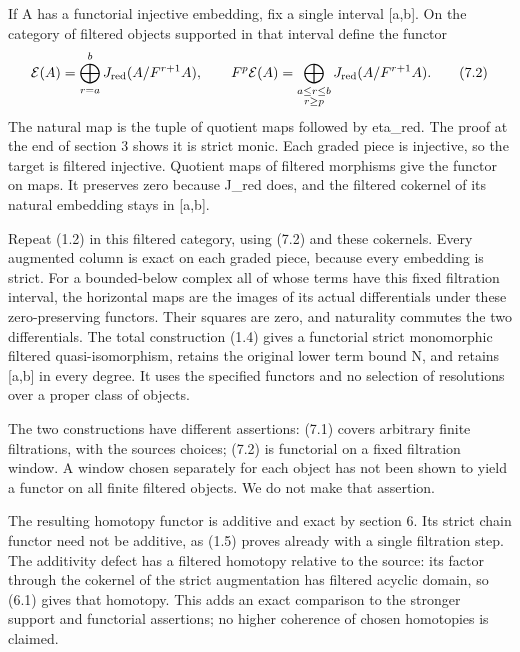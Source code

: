 \documentclass[11pt]{article}
\begin{document}
If A has a functorial injective embedding,\allowbreak{} fix a single interval [a,\allowbreak{}b]\allowbreak{}. On the category of filtered objects supported in that interval define the functor \[
 \mathcal E(A)=
 \bigoplus_{r=a}^{b}J_{\rm red}(A/F^{r+1}A),\qquad
 F^p\mathcal E(A)=
 \bigoplus_{\substack{a\le r\le b\\r\ge p}}
              J_{\rm red}(A/F^{r+1}A).                       \tag{7.2}
\] The natural map is the tuple of quotient maps followed by eta\_\allowbreak{}red. The proof at the end of section 3 shows it is strict monic. Each graded piece is injective,\allowbreak{} so the target is filtered injective. Quotient maps of filtered morphisms give the functor on maps. It preserves zero because J\_\allowbreak{}red does,\allowbreak{} and the filtered cokernel of its natural embedding stays in [a,\allowbreak{}b]\allowbreak{}.

Repeat (1.2)\allowbreak{} in this filtered category,\allowbreak{} using (7.2)\allowbreak{} and these cokernels. Every augmented column is exact on each graded piece,\allowbreak{} because every embedding is strict. For a bounded-below complex all of whose terms have this fixed filtration interval,\allowbreak{} the horizontal maps are the images of its actual differentials under these zero-preserving functors. Their squares are zero,\allowbreak{} and naturality commutes the two differentials. The total construction (1.4)\allowbreak{} gives a functorial strict monomorphic filtered quasi-isomorphism,\allowbreak{} retains the original lower term bound N,\allowbreak{} and retains [a,\allowbreak{}b]\allowbreak{} in every degree. It uses the specified functors and no selection of resolutions over a proper class of objects.

The two constructions have different assertions:\allowbreak{} (7.1)\allowbreak{} covers arbitrary finite filtrations,\allowbreak{} with the source\textquotesingle s choices; (7.2)\allowbreak{} is functorial on a fixed filtration window. A window chosen separately for each object has not been shown to yield a functor on all finite filtered objects. We do not make that assertion.

The resulting homotopy functor is additive and exact by section 6. Its strict chain functor need not be additive,\allowbreak{} as (1.5)\allowbreak{} proves already with a single filtration step. The additivity defect has a filtered homotopy relative to the source:\allowbreak{} its factor through the cokernel of the strict augmentation has filtered acyclic domain,\allowbreak{} so (6.1)\allowbreak{} gives that homotopy. This adds an exact comparison to the stronger support and functorial assertions; no higher coherence of chosen homotopies is claimed.
\end{document}
